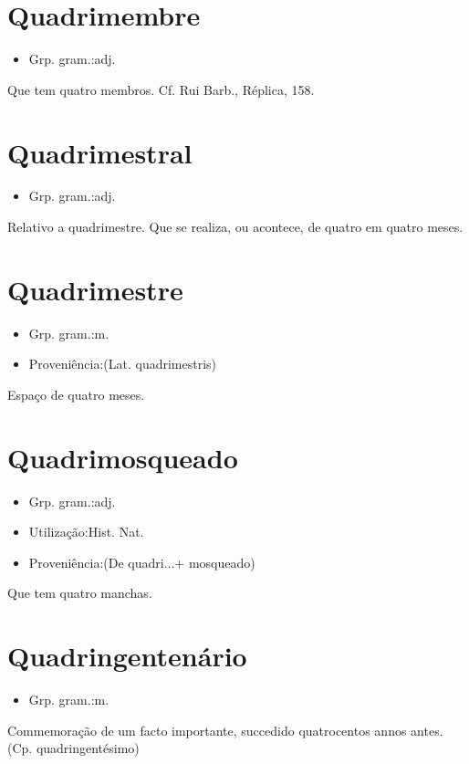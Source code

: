 \section{Quadrimembre}
\begin{itemize}
\item {Grp. gram.:adj.}
\end{itemize}
Que tem quatro membros. Cf. Rui Barb., \textunderscore Réplica\textunderscore , 158.
\section{Quadrimestral}
\begin{itemize}
\item {Grp. gram.:adj.}
\end{itemize}
Relativo a quadrimestre.
Que se realiza, ou acontece, de quatro em quatro meses.
\section{Quadrimestre}
\begin{itemize}
\item {Grp. gram.:m.}
\end{itemize}
\begin{itemize}
\item {Proveniência:(Lat. \textunderscore quadrimestris\textunderscore )}
\end{itemize}
Espaço de quatro meses.
\section{Quadrimosqueado}
\begin{itemize}
\item {Grp. gram.:adj.}
\end{itemize}
\begin{itemize}
\item {Utilização:Hist. Nat.}
\end{itemize}
\begin{itemize}
\item {Proveniência:(De \textunderscore quadri...\textunderscore  + \textunderscore mosqueado\textunderscore )}
\end{itemize}
Que tem quatro manchas.
\section{Quadringentenário}
\begin{itemize}
\item {Grp. gram.:m.}
\end{itemize}
Commemoração de um facto importante, succedido quatrocentos annos antes.
(Cp. \textunderscore quadringentésimo\textunderscore )
